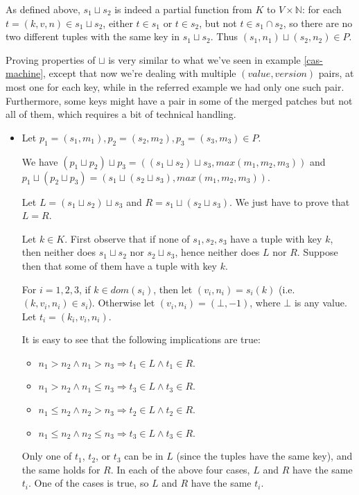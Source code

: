 \documentclass[12pt,a4paper,en]{pracamgr}
\newcommand{\mbb}[1]{\mathbb{#1}}
\begin{document}
\begin{ex}
\begin{itemize}
            As defined above, $s_1 \sqcup s_2$ is indeed a partial function from $K$ to $V \times \mbb N$: for each $t = (k, v, n) \in s_1 \sqcup s_2$, either $t \in s_1$ or $t \in s_2$, but not $t \in s_1 \cap s_2$, so there are no two different tuples with the same key in $s_1 \sqcup s_2$. Thus $(s_1, n_1) \sqcup (s_2, n_2) \in P$.
	\end{itemize}

    Proving properties of $\sqcup$ is very similar to what we've seen in example \ref{cas-machine}, except that now we're dealing with multiple $(value, version)$ pairs, at most one for each key, while in the referred example we had only one such pair. Furthermore, some keys might have a pair in some of the merged patches but not all of them, which requires a bit of technical handling.
	\begin{itemize}
        \item Let $p_1 = (s_1, m_1), p_2 = (s_2, m_2), p_3 = (s_3, m_3) \in P$.

            We have $(p_1 \sqcup p_2) \sqcup p_3 = ((s_1 \sqcup s_2) \sqcup s_3, max(m_1, m_2, m_3))$ and $p_1 \sqcup (p_2 \sqcup p_3) = (s_1 \sqcup (s_2 \sqcup s_3), max(m_1, m_2, m_3))$.

            Let $L = (s_1 \sqcup s_2) \sqcup s_3$ and $R = s_1 \sqcup (s_2 \sqcup s_3)$. We just have to prove that $L = R$.

            Let $k \in K$. First observe that if none of $s_1, s_2, s_3$ have a tuple with key $k$, then neither does $s_1 \sqcup s_2$ nor $s_2 \sqcup s_3$, hence neither does $L$ nor $R$. Suppose then that some of them have a tuple with key $k$.

            For $i = 1, 2, 3$, if $k \in dom(s_i)$, then let $(v_i, n_i) = s_i(k)$ (i.e. $(k, v_i, n_i) \in s_i$). Otherwise let $(v_i, n_i) = (\bot, -1)$, where $\bot$ is any value. Let $t_i = (k_i, v_i, n_i)$.

			It is easy to see that the following implications are true:
			\begin{itemize}
				\item $n_1 > n_2 \land n_1 > n_3 \Rightarrow t_1 \in L \land t_1 \in R$.
                \item $n_1 > n_2 \land n_1 \le n_3 \Rightarrow t_3 \in L \land t_3 \in R$.
                \item $n_1 \le n_2 \land n_2 > n_3 \Rightarrow t_2 \in L \land t_2 \in R$.
                \item $n_1 \le n_2 \land n_2 \le n_3 \Rightarrow t_3 \in L \land t_3 \in R$.
			\end{itemize}
            Only one of $t_1$, $t_2$, or $t_3$ can be in $L$ (since the tuples have the same key), and the same holds for $R$. In each of the above four cases, $L$ and $R$ have the same $t_i$. One of the cases is true, so $L$ and $R$ have the same $t_i$.


\end{itemize}
\end{ex}
\end{document}
